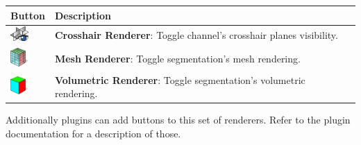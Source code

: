 \begin{tabular}{| m{1.3cm} | m{12cm} |}
\hline
\textbf{Button} & \textbf{Description}\\
\hline
\includegraphics[width=0.7cm]{../../frontend/rsc/show_planes} &
\textbf{Crosshair Renderer}: Toggle channel's crosshair planes visibility.\\
\hline
\includegraphics[width=0.7cm]{../../frontend/rsc/mesh} &
\textbf{Mesh Renderer}: Toggle segmentation's mesh rendering.\\
\hline
\includegraphics[width=0.7cm]{../../frontend/rsc/voxel} &
\textbf{Volumetric Renderer}: Toggle segmentation's volumetric rendering.\\
\hline
\end{tabular}
\vspace{0.3cm} 

Additionally plugins can add buttons to this set of renderers. Refer to the plugin
documentation for a description of those.

